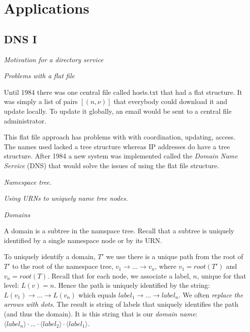 \chapter{Applications}


\section{DNS I}


\frmrule 

\textit{Motivation for a directory service}

\frmrule 

\textit{Problems with a flat file}

Until 1984 there was one central file 
called hosts.txt that had a flat structure. 
It was simply a list of pairs $[(n,\nu)]$ 
that everybody could download it and update locally. 
To update it globally, an email would be 
sent to a central file administrator. 

This flat file approach has problems with 
with coordination, updating, access. The names used
lacked a tree structure whereas IP addresses 
do have a tree structure.
After 1984 a new system was implemented called 
the \textit{Domain Name Service} (DNS) that would 
solve the issues of using the flat file structure. 

\frmrule 

\textit{Namespace tree.}


\frmrule 

\textit{Using URNs to uniquely name tree nodes.}


\frmrule 

\textit{Domains}

A domain is a subtree in the namspace tree.
Recall that a subtree is uniquely identified by 
a single namespace node or by its URN. 


\frmrule 



To uniquely identify a domain, $T'$ we use there is a unique path from the 
root of $T'$ to the root of the namespace tree, $v_1 \rightarrow ... \rightarrow v_n$, where 
$v_1 = root(T')$ and $v_n = root(T)$. 
Recall that for each node, we associate a label, $n$, unique for that level: $L(v) = n$. 
Hence the path is uniquely 
identified by the string: $L(v_1) \rightarrow ... \rightarrow L(v_n)$ 
which equals $label_1 \rightarrow ... \rightarrow label_n$. 
We often \textit{replace the arrows with dots}. 
The result is string of labels that uniquely identifies the path (and thus the domain). 
It is this string that is our \textit{domain name}: 
$\langle label_n \rangle \cdot ... \cdot \langle label_2 \rangle \cdot \langle label_1 \rangle$. 

